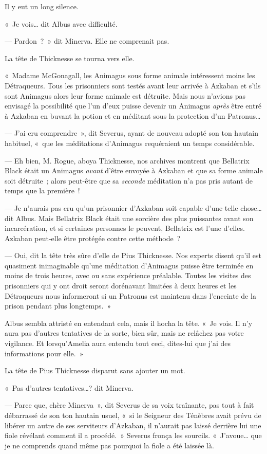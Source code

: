 Il y eut un long silence.

«~Je vois… dit Albus avec difficulté.

--- Pardon~?~» dit Minerva. Elle ne comprenait pas.

La tête de Thicknesse se tourna vers elle.

«~Madame McGonagall, les Animagus sous forme animale intéressent moins les Détraqueurs. Tous les prisonniers sont testés avant leur arrivée à Azkaban et s'ils sont Animagus alors leur forme animale est détruite. Mais nous n'avions pas envisagé la possibilité que l'un d'eux puisse devenir un Animagus \emph{après} être entré à Azkaban en buvant la potion et en méditant sous la protection d'un Patronus…

--- J'ai cru comprendre~», dit Severus, ayant de nouveau adopté son ton hautain habituel, «~que les méditations d'Animagus requéraient un temps considérable.

--- Eh bien, M. Rogue, aboya Thicknesse, nos archives montrent que Bellatrix Black était un Animagus \emph{avant} d'être envoyée à Azkaban et que sa forme animale soit détruite~; alors peut-être que sa \emph{seconde} méditation n'a pas pris autant de temps que la première~!

--- Je n'aurais pas cru qu'un prisonnier d'Azkaban soit capable d'une telle chose… dit Albus. Mais Bellatrix Black était une sorcière des plus puissantes avant son incarcération, et si certaines personnes le peuvent, Bellatrix est l'une d'elles. Azkaban peut-elle être protégée contre cette méthode~?

--- Oui, dit la tête très sûre d'elle de Pius Thicknesse. Nos experts disent qu'il est quasiment inimaginable qu'une méditation d'Animagus puisse être terminée en moins de trois heures, avec ou sans expérience préalable. Toutes les visites des prisonniers qui y ont droit seront dorénavant limitées à deux heures et les Détraqueurs nous informeront si un Patronus est maintenu dans l'enceinte de la prison pendant plus longtemps.~»

Albus sembla attristé en entendant cela, mais il hocha la tête. «~Je vois. Il n'y aura pas d'autres tentatives de la sorte, bien sûr, mais ne relâchez pas votre vigilance. Et lorsqu'Amelia aura entendu tout ceci, dites-lui que j'ai des informations pour elle.~»

La tête de Pius Thicknesse disparut sans ajouter un mot.

«~Pas d'autres tentatives…? dit Minerva.

--- Parce que, chère Minerva~», dit Severus de sa voix traînante, pas tout à fait débarrassé de son ton hautain usuel, «~si le Seigneur des Ténèbres avait prévu de libérer un autre de ses serviteurs d'Azkaban, il n'aurait pas laissé derrière lui une fiole révélant comment il a procédé.~» Severus fronça les sourcils. «~J'avoue… que je ne comprends quand même pas pourquoi la fiole a été laissée là.

